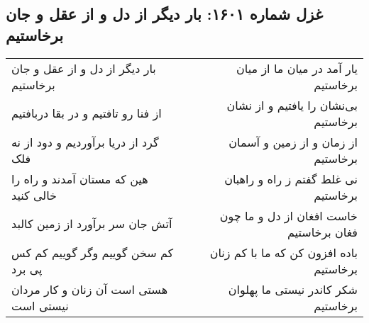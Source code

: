 \begin{center}
\section*{غزل شماره ۱۶۰۱: بار دیگر از دل و از عقل و جان برخاستیم}
\label{sec:1601}
\begin{longtable}{l p{0.5cm} r}
بار دیگر از دل و از عقل و جان برخاستیم
&&
یار آمد در میان ما از میان برخاستیم
\\
از فنا رو تافتیم و در بقا دربافتیم
&&
بی‌نشان را یافتیم و از نشان برخاستیم
\\
گرد از دریا برآوردیم و دود از نه فلک
&&
از زمان و از زمین و آسمان برخاستیم
\\
هین که مستان آمدند و راه را خالی کنید
&&
نی غلط گفتم ز راه و راهبان برخاستیم
\\
آتش جان سر برآورد از زمین کالبد
&&
خاست افغان از دل و ما چون فغان برخاستیم
\\
کم سخن گوییم وگر گوییم کم کس پی برد
&&
باده افزون کن که ما با کم زنان برخاستیم
\\
هستی است آن زنان و کار مردان نیستی است
&&
شکر کاندر نیستی ما پهلوان برخاستیم
\\
\end{longtable}
\end{center}
